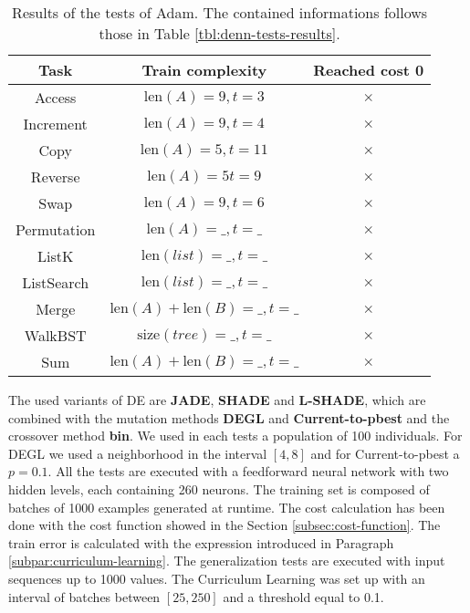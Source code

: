 \begin{table}[t]
	\centering
	
	\begin{tabular}{ccc}
		\rowcolor{Gray} \textbf{Task} & \textbf{Train complexity} & \textbf{Reached cost 0} \\ \hline
		Access & $\textrm{len}(A) = 9, t = 3$ & $\times$ \\ 
		Increment & $\textrm{len}(A) = 9, t = 4$ & $\times$ \\
		Copy & $\textrm{len}(A) = 5, t = 11$  & $\times$  \\ 
		Reverse & $\textrm{len}(A) = 5 t = 9$  & $\times$ \\ 
		Swap & $\textrm{len}(A) = 9, t = 6$ & $\times$ \\ \hline\hline
		Permutation & $\textrm{len}(A) = \_, t = \_$ & $\times$ \\ 
		ListK & $\textrm{len}(list) = \_, t = \_$ & $\times$ \\ 
		ListSearch & $\textrm{len}(list) = \_, t = \_$ & $\times$  \\ 
		Merge & $\textrm{len}(A)+\textrm{len}(B) = \_, t=\_$ & $\times$ \\ 
		WalkBST & $\textrm{size}(tree) = \_, t=\_$ & $\times$  \\ 
		Sum & $\textrm{len}(A)+\textrm{len}(B) = \_, t=\_$ & $\times$ \\
	\end{tabular}
	\caption{Results of the tests of Adam. The contained informations follows those in Table \ref{tbl:denn-tests-results}\label{tbl:adam-tests}.}
\end{table}
The used variants of DE are \textbf{JADE}, \textbf{SHADE} and \textbf{L-SHADE}, which are combined with the mutation methods \textbf{DEGL} and \textbf{Current-to-pbest} and the crossover method \textbf{bin}. We used in each tests a population of 100 individuals. For DEGL we used a neighborhood in the interval $[4, 8]$ and for Current-to-pbest a $p = 0.1$. All the tests are executed with a feedforward neural network with two hidden levels, each containing 260 neurons. The training set is composed of batches of 1000 examples generated at runtime. The cost calculation has been done with the cost function showed in the Section \ref{subsec:cost-function}. The train error is calculated with the expression introduced in Paragraph \ref{subpar:curriculum-learning}. The generalization tests are executed with input sequences up to 1000 values. The Curriculum Learning was set up with an interval of batches between $[25, 250]$ and a threshold equal to 0.1. \newline\newline

